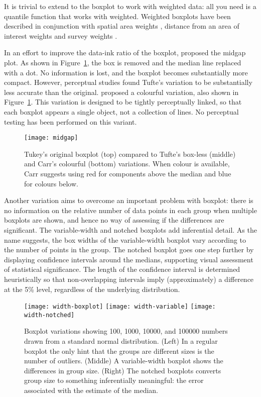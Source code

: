 \documentclass[oneside]{article}
\begin{document}
It is trivial to extend to the boxplot to work with weighted data: all you need is a quantile function that works with weighted. Weighted boxplots have been described in conjunction with spatial area weights \citep{willmott:2007}, distance from an area of interest weights \citep{dykes:2007} and survey weights \citep{survey,korn:1998}.


In an effort to improve the data-ink ratio of the boxplot, \citet{tufte} proposed the midgap plot. As shown in Figure~\ref{fig:tufte}, the box is removed and the median line replaced with a dot. No information is lost, and the boxplot becomes substantially more compact. However, perceptual studies \citep{stock:1991} found Tufte's variation to be substantially less accurate than the original. \citet{carr:1994a} proposed a colourful variation, also shown in Figure~\ref{fig:tufte}. This variation is designed to be tightly perceptually linked, so that each boxplot appears a single object, not a collection of lines. No perceptual testing has been performed on this variant.

\begin{figure}[htbp]
  \centering
  \texttt{[image: midgap]}
  \caption{Tukey's original boxplot (top) compared to Tufte's box-less (middle) and Carr's colourful (bottom) variations. When colour is available, Carr suggests using red for components above the median and blue for colours below.}
  \label{fig:tufte}
\end{figure}

Another variation aims to overcome an important problem with boxplot: there is no information on the relative number of data points in each group when multiple boxplots are shown, and hence no way of assessing if the differences are significant. The variable-width and notched boxplots \citep{varistomd} add inferential detail. As the name suggests, the box widths of the variable-width boxplot vary according to the number of points in the group. The notched boxplot goes one step further by displaying confidence intervals around the medians, supporting visual assessment of statistical significance. The length of the confidence interval is determined heuristically so that non-overlapping intervals imply (approximately) a difference at the 5\% level, regardless of the underlying distribution.

\begin{figure}[htbp]
  \centering
  \texttt{[image: width-boxplot]}%
  \texttt{[image: width-variable]}%
  \texttt{[image: width-notched]}
  \caption{Boxplot variations showing 100, 1000, 10000, and 100000 numbers drawn from a standard normal distribution.  (Left) In a regular boxplot the only hint that the groups are different sizes is the number of outliers. (Middle) A variable-width boxplot shows the differences in group size.  (Right) The notched boxplots converts group size to something inferentially meaningful: the error associated with the estimate of the median.}
  \label{fig:width}
\end{figure}
\end{document}
